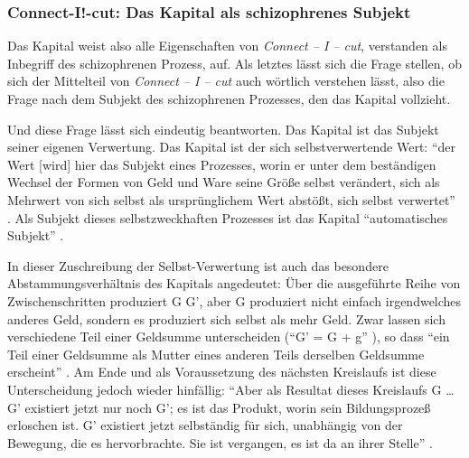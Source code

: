 \documentclass[12pt,
               DIV13,
               paper=a4,
               twoside=false,
               onehalfspacing,
               bibliography=totoc,
               toc=graduated,
               draft,
               ]{scrartcl}
\newcommand{\pc}[2]{\parencite[#1]{#2}}
\newcommand{\cic}{Connect -- I -- cut\xspace}
\begin{document}

\subsubsection{Connect-I!-cut: Das Kapital als schizophrenes Subjekt}

Das Kapital weist also alle Eigenschaften von \emph{\cic}, verstanden
als Inbegriff des schizophrenen Prozess, auf. Als letztes lässt sich
die Frage stellen, ob sich der Mittelteil von \emph{\cic} auch
wörtlich verstehen lässt, also die Frage nach dem Subjekt des
schizophrenen Prozesses, den das Kapital vollzieht.

Und diese Frage lässt sich eindeutig beantworten. Das Kapital ist das
Subjekt seiner eigenen Verwertung. Das Kapital ist der sich
selbstverwertende Wert: "`der Wert [wird] hier das Subjekt eines
Prozesses, worin er unter dem beständigen Wechsel der Formen von Geld
und Ware seine Größe selbst verändert, sich als Mehrwert von sich
selbst als ursprünglichem Wert abstößt, sich selbst verwertet"'
\pc{169}{kap}. Als Subjekt dieses selbstzweckhaften Prozesses ist das
Kapital "`automatisches Subjekt"' \pc{169}{kap}.

In dieser Zuschreibung der Selbst-Verwertung ist auch das besondere
\glq Abstammungsverhältnis\grq{} des Kapitals angedeutet: Über die
ausgeführte Reihe von Zwischenschritten \glq produziert\grq{} G G',
aber G \glq produziert\grq{} nicht einfach irgendwelches anderes Geld,
sondern es produziert sich selbst als mehr Geld. Zwar lassen sich
verschiedene Teil einer Geldsumme unterscheiden ("`G' = G + g"'
\pc{51}{kap2}), so dass "`ein Teil einer Geldsumme als Mutter eines
anderen Teils derselben Geldsumme erscheint"' \pc{55}{kap2}. Am Ende
und als Voraussetzung des nächsten Kreislaufs ist diese Unterscheidung
jedoch wieder hinfällig: "`Aber als Resultat dieses Kreislaufs G \dots
G' existiert jetzt nur noch G'; es ist das Produkt, worin sein
Bildungsprozeß erloschen ist. G' existiert jetzt selbständig für sich,
unabhängig von der Bewegung, die es hervorbrachte. Sie ist vergangen,
es ist da an ihrer Stelle"' \pc{49}{kap2}.
\end{document}
